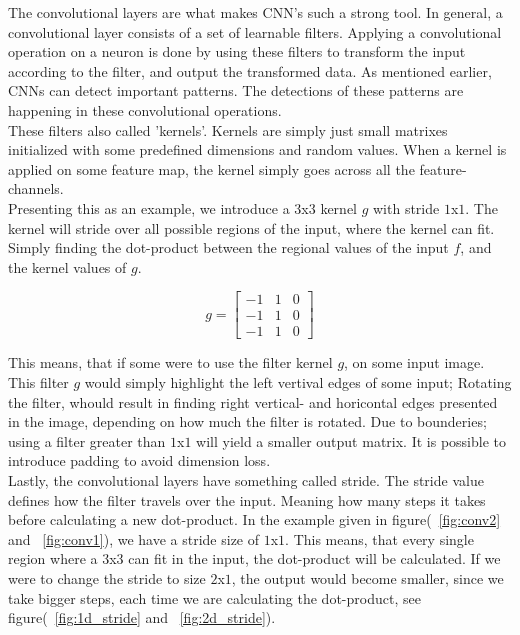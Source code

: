 The convolutional layers are what makes CNN's such a strong tool. In general, a convolutional layer consists of a set of learnable filters. Applying a convolutional operation on a neuron is done by using these filters to transform the input according to the filter, and output the transformed data. As mentioned earlier, CNNs can detect important patterns. The detections of these patterns are happening in these convolutional operations.\\

\noindent
These filters also called 'kernels'. Kernels are simply just small matrixes initialized with some predefined dimensions and random values. When a kernel is applied on some feature map, the kernel simply goes across all the feature-channels.\\

\noindent
Presenting this as an example, we introduce a $3$x$3$ kernel $g$ with stride $1$x$1$. The kernel will stride over all possible regions of the input, where the kernel can fit. Simply finding the dot-product between the regional values of the input $f$, and the kernel values of $g$.

$$ g = \begin{bmatrix}
-1 & 1 & 0 \\
-1 & 1 & 0 \\
-1 & 1 & 0
\end{bmatrix}
$$

\noindent
This means, that if some were to use the filter kernel $g$, on some input image. This filter $g$ would simply highlight the left vertival edges of some input; Rotating the filter, whould result in finding right vertical- and horicontal edges presented in the image, depending on how much the filter is rotated. Due to bounderies; using a filter greater than $1$x$1$ will yield a smaller output matrix. It is possible to introduce padding to avoid dimension loss.\\

\noindent
Lastly, the convolutional layers have something called stride. The stride value defines how the filter travels over the input. Meaning how many steps it takes before calculating a new dot-product. In the example given in figure(~\ref{fig:conv2} and ~\ref{fig:conv1}), we have a stride size of $1$x$1$. This means, that every single region where a $3$x$3$ can fit in the input, the dot-product will be calculated. If we were to change the stride to size $2$x$1$, the output would become smaller, since we take bigger steps, each time we are calculating the dot-product, see figure(~\ref{fig:1d_stride} and ~\ref{fig:2d_stride}).

